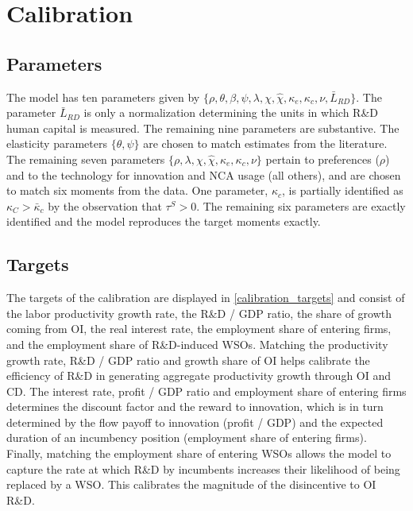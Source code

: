 \documentclass[11pt,english]{article}
\begin{document}
\section{Calibration}\label{sec:calibration}

\subsection{Parameters}

The model has ten parameters given by $\{\rho, \theta, \beta, \psi, \lambda, \chi, \hat{\chi}, \kappa_e, \kappa_c, \nu, \bar{L}_{RD}\}$. The parameter $\bar{L}_{RD}$ is only a normalization determining the units in which R\&D human capital is measured. The remaining nine parameters are substantive. The elasticity parameters $\{\theta, \psi\}$ are chosen to match estimates from the literature. The remaining seven parameters $\{\rho, \lambda, \chi, \hat{\chi}, \kappa_e, \kappa_c, \nu\}$ pertain to preferences ($\rho$) and to the technology for innovation and NCA usage (all others), and are chosen to match six moments from the data. One parameter, $\kappa_c$, is partially identified as $\kappa_C > \bar{\kappa}_c$ by the observation that $\tau^S > 0$. The remaining six parameters are exactly identified and the model reproduces the target moments exactly. 

\subsection{Targets}

The targets of the calibration are displayed in \autoref{calibration_targets} and consist of the labor productivity growth rate, the R\&D / GDP ratio, the share of growth coming from OI, the real interest rate, the employment share of entering firms, and the employment share of R\&D-induced WSOs. Matching the productivity growth rate, R\&D / GDP ratio and growth share of OI helps calibrate the efficiency of R\&D in generating aggregate productivity growth through OI and CD. The interest rate, profit / GDP ratio and employment share of entering firms determines the discount factor and the reward to innovation, which is in turn determined by the flow payoff to innovation (profit / GDP) and the expected duration of an incumbency position (employment share of entering firms). Finally, matching the employment share of entering WSOs allows the model to capture the rate at which R\&D by incumbents increases their likelihood of being replaced by a WSO. This calibrates the magnitude of the disincentive to OI R\&D.
\end{document}

